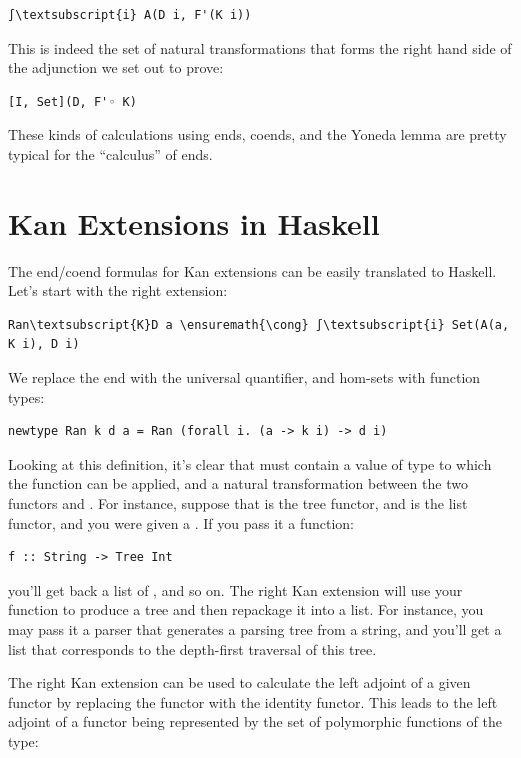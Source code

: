\begin{Verbatim}[commandchars=\\\{\}]
∫\textsubscript{i} A(D i, F'(K i))
\end{Verbatim}
This is indeed the set of natural transformations that forms the right
hand side of the adjunction we set out to prove:

\begin{verbatim}
[I, Set](D, F'◦ K)
\end{verbatim}
These kinds of calculations using ends, coends, and the Yoneda lemma are
pretty typical for the ``calculus'' of ends.

\section{Kan Extensions in Haskell}\label{kan-extensions-in-haskell}

The end/coend formulas for Kan extensions can be easily translated to
Haskell. Let's start with the right extension:

\begin{Verbatim}[commandchars=\\\{\}]
Ran\textsubscript{K}D a \ensuremath{\cong} ∫\textsubscript{i} Set(A(a, K i), D i)
\end{Verbatim}
We replace the end with the universal quantifier, and hom-sets with
function types:

\begin{verbatim}
newtype Ran k d a = Ran (forall i. (a -> k i) -> d i)
\end{verbatim}
Looking at this definition, it's clear that  must contain a
value of type  to which the function can be applied, and a
natural transformation between the two functors  and
. For instance, suppose that  is the tree functor,
and  is the list functor, and you were given a
. If you pass it a function:

\begin{verbatim}
f :: String -> Tree Int
\end{verbatim}
you'll get back a list of , and so on. The right Kan
extension will use your function to produce a tree and then repackage it
into a list. For instance, you may pass it a parser that generates a
parsing tree from a string, and you'll get a list that corresponds to
the depth-first traversal of this tree.

The right Kan extension can be used to calculate the left adjoint of a
given functor by replacing the functor  with the identity
functor. This leads to the left adjoint of a functor  being
represented by the set of polymorphic functions of the type:

